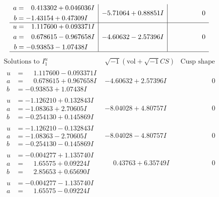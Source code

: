 \documentclass[1p]{elsarticle_modified}
\theoremstyle{definition}
\newcommand{\I}{\sqrt{-1}}
\begin{document}
$$\begin{array}{c|c|c}
\begin{aligned}
a &= \phantom{-}0.413302 + 0.046036 I \\
b &= -1.43154 + 0.47309 I\end{aligned}
 & -5.71064 + 0.88851 I & \phantom{-0.000000 } 0 \\ \hline\begin{aligned}
u &= \phantom{-}1.117600 + 0.093371 I \\
a &= \phantom{-}0.678615 - 0.967658 I \\
b &= -0.93853 - 1.07438 I\end{aligned}
 & -4.60632 - 2.57396 I & \phantom{-0.000000 } 0\\
 \hline 
 \end{array}$$\newpage$$\begin{array}{c|c|c}  
\text{Solutions to }I^u_{1}& \I (\text{vol} + \sqrt{-1}CS) & \text{Cusp shape}\\
 \hline 
\begin{aligned}
u &= \phantom{-}1.117600 - 0.093371 I \\
a &= \phantom{-}0.678615 + 0.967658 I \\
b &= -0.93853 + 1.07438 I\end{aligned}
 & -4.60632 + 2.57396 I & \phantom{-0.000000 } 0 \\ \hline\begin{aligned}
u &= -1.126210 + 0.132843 I \\
a &= -1.08363 + 2.70605 I \\
b &= -0.254130 + 0.145869 I\end{aligned}
 & -8.04028 + 4.80757 I & \phantom{-0.000000 } 0 \\ \hline\begin{aligned}
u &= -1.126210 - 0.132843 I \\
a &= -1.08363 - 2.70605 I \\
b &= -0.254130 - 0.145869 I\end{aligned}
 & -8.04028 - 4.80757 I & \phantom{-0.000000 } 0 \\ \hline\begin{aligned}
u &= -0.004277 + 1.135740 I \\
a &= \phantom{-}1.65575 + 0.09224 I \\
b &= \phantom{-}2.85653 + 0.65690 I\end{aligned}
 & \phantom{-}0.43763 + 6.35749 I & \phantom{-0.000000 } 0 \\ \hline\begin{aligned}
u &= -0.004277 - 1.135740 I \\
a &= \phantom{-}1.65575 - 0.09224 I \\

\end{aligned}
\end{array}$$
\end{document}
